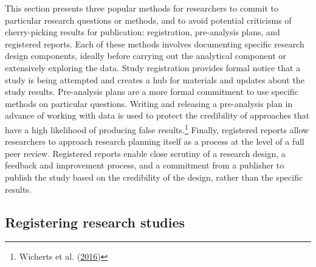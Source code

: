 \documentclass[
]{book}
\begin{document}
This section presents three popular methods
for researchers to commit to particular research questions or methods,
and to avoid potential criticisms of cherry-picking results for publication:
registration, pre-analysis plans, and registered reports.
Each of these methods involves documenting specific research design components,
ideally before carrying out the analytical component or extensively exploring the data.
Study registration provides formal notice that a study is being attempted
and creates a hub for materials and updates about the study results.
Pre-analysis plans are a more formal commitment
to use specific methods on particular questions.
Writing and releasing a pre-analysis plan
in advance of working with data is used to protect the credibility
of approaches that have a high likelihood of producing false results.\footnote{Wicherts et al. (\protect\hyperlink{ref-wicherts2016degrees}{2016})}
Finally, registered reports allow researchers to approach research planning itself
as a process at the level of a full peer review.
Registered reports enable close scrutiny of a research design,
a feedback and improvement process,
and a commitment from a publisher to publish the study
based on the credibility of the design, rather than the specific results.

\hypertarget{registering-research-studies}{%
\subsection*{Registering research studies}\label{registering-research-studies}}
\end{document}
